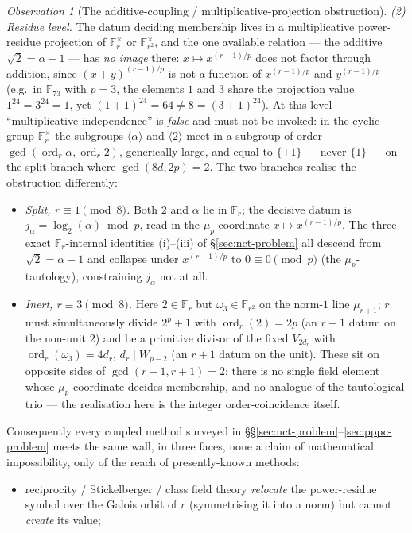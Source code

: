\documentclass[11pt]{amsart}
\theoremstyle{plain}
\theoremstyle{definition}
\theoremstyle{remark}
\newtheorem{observation}[theorem]{Observation}
\numberwithin{equation}{section}
\newcommand{\ord}{\operatorname{ord}}
\newcommand{\F}{\mathbb{F}}
\begin{document}
\begin{observation}[The additive-coupling / multiplicative-projection obstruction]
\emph{(2) Residue level.} The datum deciding membership lives in a multiplicative power-residue projection of $\F_r^\times$ or $\F_{r^2}^\times$, and the one available relation --- the additive $\sqrt 2 = \alpha - 1$ --- has \emph{no image} there: $x \mapsto x^{(r-1)/p}$ does not factor through addition, since $(x + y)^{(r-1)/p}$ is not a function of $x^{(r-1)/p}$ and $y^{(r-1)/p}$ (e.g.\ in $\F_{73}$ with $p = 3$, the elements $1$ and $3$ share the projection value $1^{24} = 3^{24} = 1$, yet $(1+1)^{24} = 64 \neq 8 = (3+1)^{24}$). At this level ``multiplicative independence'' is \emph{false} and must not be invoked: in the cyclic group $\F_r^\times$ the subgroups $\langle \alpha \rangle$ and $\langle 2 \rangle$ meet in a subgroup of order $\gcd(\ord_r \alpha, \ord_r 2)$, generically large, and equal to $\{\pm 1\}$ --- never $\{1\}$ --- on the split branch where $\gcd(8 d, 2 p) = 2$. The two branches realise the obstruction differently:
\begin{itemize}
\item \emph{Split, $r \equiv 1 \pmod 8$.} Both $2$ and $\alpha$ lie in $\F_r$; the decisive datum is $j_\alpha = \log_2(\alpha) \bmod p$, read in the $\mu_p$-coordinate $x \mapsto x^{(r-1)/p}$. The three exact $\F_r$-internal identities (i)--(iii) of \S\ref{sec:nct-problem} all descend from $\sqrt 2 = \alpha - 1$ and collapse under $x^{(r-1)/p}$ to $0 \equiv 0 \pmod p$ (the $\mu_p$-tautology), constraining $j_\alpha$ not at all.
\item \emph{Inert, $r \equiv 3 \pmod 8$.} Here $2 \in \F_r$ but $\omega_3 \in \F_{r^2}$ on the norm-$1$ line $\mu_{r+1}$; $r$ must simultaneously divide $2^p + 1$ with $\ord_r(2) = 2 p$ (an $r-1$ datum on the non-unit $2$) and be a primitive divisor of the fixed $V_{2 d_r}$ with $\ord_r(\omega_3) = 4 d_r$, $d_r \mid W_{p-2}$ (an $r+1$ datum on the unit). These sit on opposite sides of $\gcd(r-1, r+1) = 2$; there is no single field element whose $\mu_p$-coordinate decides membership, and no analogue of the tautological trio --- the realisation here is the integer order-coincidence itself.
\end{itemize}
Consequently every coupled method surveyed in \S\S\ref{sec:nct-problem}--\ref{sec:pppc-problem} meets the same wall, in three faces, none a claim of mathematical impossibility, only of the reach of presently-known methods:
\begin{itemize}
\item[(R)] reciprocity / Stickelberger / class field theory \emph{relocate} the power-residue symbol over the Galois orbit of $r$ (symmetrising it into a norm) but cannot \emph{create} its value;

\end{itemize}
\end{observation}
\end{document}
